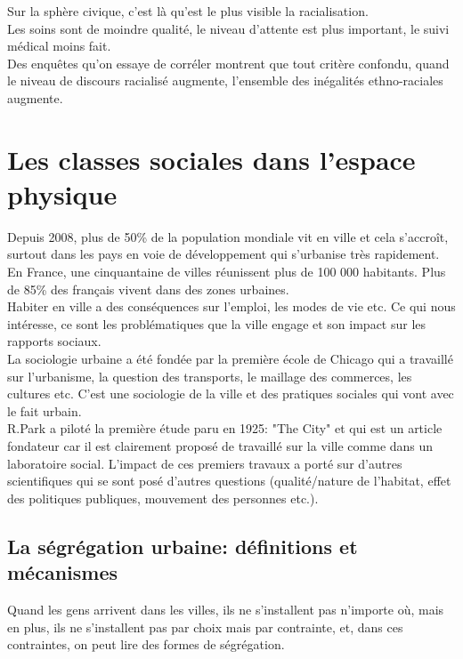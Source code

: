 \documentclass[12pt, a4paper, openany]{book}
\begin{document}
Sur la sphère civique, c'est là qu'est le plus visible la racialisation. \\
Les soins sont de moindre qualité, le niveau d'attente est plus important, le suivi médical moins fait. \\
Des enquêtes qu'on essaye de corréler montrent que tout critère confondu, quand le niveau de discours racialisé augmente, l'ensemble des inégalités ethno-raciales augmente. 

\chapter{Les classes sociales dans l'espace physique}

Depuis 2008, plus de 50\% de la population mondiale vit en ville et cela s'accroît, surtout dans les pays en voie de développement qui s'urbanise très rapidement. \\
En France, une cinquantaine de villes réunissent plus de 100 000 habitants. Plus de 85\% des français vivent dans des zones urbaines. \\
Habiter en ville a des conséquences sur l'emploi, les modes de vie etc. Ce qui nous intéresse, ce sont les problématiques que la ville engage et son impact sur les rapports sociaux. \\
La sociologie urbaine a été fondée par la première école de Chicago qui a travaillé sur l'urbanisme, la question des transports, le maillage des commerces, les cultures etc. C'est une sociologie de la ville et des pratiques sociales qui vont avec le fait urbain. \\
R.Park a piloté la première étude paru en 1925: "The City" et qui est un article fondateur car il est clairement proposé de travaillé sur la ville comme dans un laboratoire social. L'impact de ces premiers travaux a porté sur d'autres scientifiques qui se sont posé d'autres questions (qualité/nature de l'habitat, effet des politiques publiques, mouvement des personnes etc.).


\section{La ségrégation urbaine: définitions et mécanismes}

Quand les gens arrivent dans les villes, ils ne s'installent pas n'importe où, mais en plus, ils ne s'installent pas par choix mais par contrainte, et, dans ces contraintes, on peut lire des formes de ségrégation. \\
\end{document}

